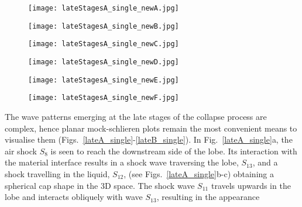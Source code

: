 \documentclass[3p,times,twocolumn]{elsarticle}
\begin{document}
\begin{figure*}
\begin{minipage}{2\columnwidth}
\centering
        \begin{subfigure}[b]{0.329\textwidth}
\texttt{[image: lateStagesA\_single\_newA.jpg]}
        \end{subfigure}
        \begin{subfigure}[b]{0.329\textwidth}
\texttt{[image: lateStagesA\_single\_newB.jpg]}
        \end{subfigure}
\begin{subfigure}[b]{0.329\textwidth}
\texttt{[image: lateStagesA\_single\_newC.jpg]}
        \end{subfigure}
\end{minipage}
\begin{minipage}{2\columnwidth}
\centering
\begin{subfigure}[b]{0.329\textwidth}
\texttt{[image: lateStagesA\_single\_newD.jpg]}
        \end{subfigure}
        \begin{subfigure}[b]{0.329\textwidth}
\texttt{[image: lateStagesA\_single\_newE.jpg]}
        \end{subfigure}
\begin{subfigure}[b]{0.329\textwidth}
\texttt{[image: lateStagesA\_single\_newF.jpg]}
        \end{subfigure}
\end{minipage}
\caption{Mock-schlieren images of the late stages in the collapse process
of a single cavity, on the central $xz$-plane of the three-dimensional field,
at selected times after the collapse. Shocks are denoted as `S' and
zones as `Z'. The horizontal axis represents $x$  and the vertical
axis $z$, both in \SI{}{\micro \meter}.  }
\label{lateA_single}
\end{figure*} 
The wave patterns emerging at the late stages of the collapse process are
 complex, hence  planar mock-schlieren plots remain the most convenient means to visualise them (Figs.\ \ref{lateA_single}-\ref{lateB_single}).
   In Fig.\ \ref{lateA_single}a, the air shock $S_8$ is seen to reach the
downstream side of the lobe. Its interaction with the material interface
results in a shock wave traversing the lobe, $S_{13}$, and a shock travelling in the liquid, $S_{12}$, (see Figs.\ \ref{lateA_single}b-c) obtaining a spherical cap shape in the 3D space. 
The shock wave $S_{11}$ travels upwards in the lobe and interacts obliquely with wave $S_{13}$, resulting in the appearance
\end{document}
